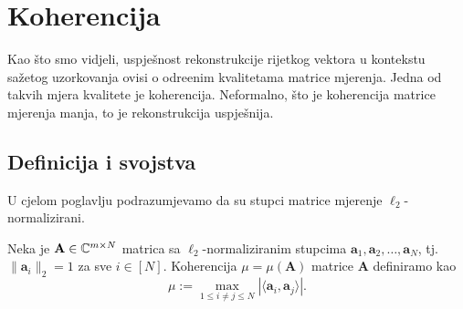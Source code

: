 \documentclass[a4paper,twoside,12pt]{memoir} %
\newcommand{\vect}[1]{\mathbf{#1}}
\renewcommand{\vec}{\vect}
\newcommand{\norm}[1]{\|{#1}\|}
\begin{document}
\chapter[Koherencija][Koherencija]{Koherencija}
Kao \v{s}to smo vidjeli, uspje\v{s}nost rekonstrukcije rijetkog vektora u kontekstu sa\v{z}etog uzorkovanja ovisi o odre\dj enim kvalitetama matrice mjerenja. Jedna od takvih mjera kvalitete je koherencija. Neformalno, \v{s}to je koherencija matrice mjerenja manja, to je rekonstrukcija uspje\v{s}nija.  

\section[Definicija i svojstva][Definicija i svojstva]{Definicija i svojstva}
U cjelom poglavlju podrazumjevamo da su stupci matrice mjerenje $\ell_2$-normalizirani.
\begin{defn}
    Neka je $\vec A \in \C^{m \times N}$ matrica sa $\ell_2$-normaliziranim stupcima $\vec a_1, \vec a_2, \dots, \vec a_N$, tj. $\norm{\vec a_i}_2 = 1$ za sve $i \in [N]$. Koherencija $\mu = \mu(\vec A)$ matrice $\vec A$ definiramo kao
    \begin{equation}\label{5:1}
        \mu := \max_{1 \leq i \neq j \leq N} |\langle \vec a_i, \vec a_j \rangle| .
    \end{equation}
\end{defn}
\end{document}
